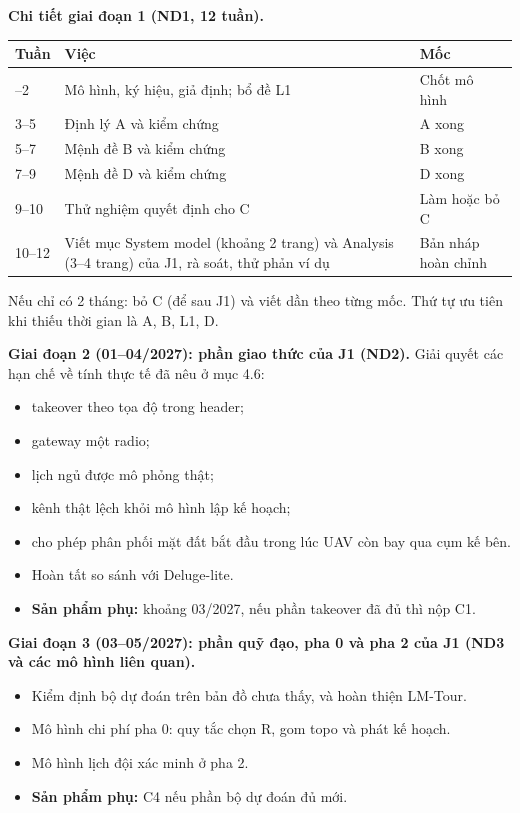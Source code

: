 \textbf{Chi tiết giai đoạn 1 (ND1, 12 tuần).}

\begin{longtable}[]{@{}lll@{}}
\toprule\noalign{}
Tuần & Việc & Mốc \\
\midrule\noalign{}
\endhead
\bottomrule\noalign{}
\endlastfoot
1--2 & Mô hình, ký hiệu, giả định; bổ đề L1 & Chốt mô hình \\
3--5 & Định lý A và kiểm chứng & A xong \\
5--7 & Mệnh đề B và kiểm chứng & B xong \\
7--9 & Mệnh đề D và kiểm chứng & D xong \\
9--10 & Thử nghiệm quyết định cho C & Làm hoặc bỏ C \\
10--12 & Viết mục System model (khoảng 2 trang) và Analysis (3--4 trang)
của J1, rà soát, thử phản ví dụ & Bản nháp hoàn chỉnh \\
\end{longtable}

Nếu chỉ có 2 tháng: bỏ C (để sau J1) và viết dần theo từng mốc. Thứ tự
ưu tiên khi thiếu thời gian là A, B, L1, D.

\textbf{Giai đoạn 2 (01--04/2027): phần giao thức của J1 (ND2).} Giải
quyết các hạn chế về tính thực tế đã nêu ở mục 4.6:

\begin{itemize}
\tightlist
\item
  takeover theo tọa độ trong header;
\item
  gateway một radio;
\item
  lịch ngủ được mô phỏng thật;
\item
  kênh thật lệch khỏi mô hình lập kế hoạch;
\item
  cho phép phân phối mặt đất bắt đầu trong lúc UAV còn bay qua cụm kế
  bên.
\item
  Hoàn tất so sánh với Deluge-lite.
\item
  \textbf{Sản phẩm phụ:} khoảng 03/2027, nếu phần takeover đã đủ thì nộp
  C1.
\end{itemize}

\textbf{Giai đoạn 3 (03--05/2027): phần quỹ đạo, pha 0 và pha 2 của J1
(ND3 và các mô hình liên quan).}

\begin{itemize}
\tightlist
\item
  Kiểm định bộ dự đoán trên bản đồ chưa thấy, và hoàn thiện LM-Tour.
\item
  Mô hình chi phí pha 0: quy tắc chọn R, gom topo và phát kế hoạch.
\item
  Mô hình lịch đội xác minh ở pha 2.
\item
  \textbf{Sản phẩm phụ:} C4 nếu phần bộ dự đoán đủ mới.
\end{itemize}


